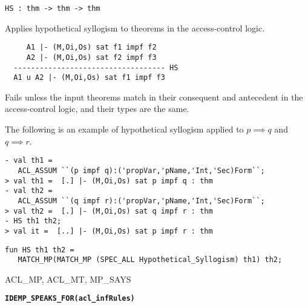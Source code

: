 \begin{verbatim}
HS : thm -> thm -> thm
\end{verbatim}

\SYNOPSIS
Applies hypothetical syllogism to theorems in the access-control logic.

\DESCRIBE
\begin{verbatim}
     A1 |- (M,Oi,Os) sat f1 impf f2
     A2 |- (M,Oi,Os) sat f2 impf f3
  ----------------------------------- HS
  A1 u A2 |- (M,Oi,Os) sat f1 impf f3
\end{verbatim}

\FAILURE 
Fails unless the input theorems match in their consequent and
antecedent in the access-control logic, and their types are the same.

\EXAMPLE
The following is an example of hypothetical syllogism applied to $p
\implies q$ and $q \implies r$.
\begin{holboxed}
\begin{verbatim}
- val th1 = 
   ACL_ASSUM ``(p impf q):('propVar,'pName,'Int,'Sec)Form``;
> val th1 =  [.] |- (M,Oi,Os) sat p impf q : thm
- val th2 = 
   ACL_ASSUM ``(q impf r):('propVar,'pName,'Int,'Sec)Form``;
> val th2 =  [.] |- (M,Oi,Os) sat q impf r : thm
- HS th1 th2;
> val it =  [..] |- (M,Oi,Os) sat p impf r : thm
\end{verbatim}

\end{holboxed}
\IMPLEMENTATION
\begin{holboxed}
\begin{verbatim}
fun HS th1 th2 = 
   MATCH_MP(MATCH_MP (SPEC_ALL Hypothetical_Syllogism) th1) th2;
\end{verbatim}
\end{holboxed}

\SEEALSO
ACL\_MP, ACL\_MT, MP\_SAYS
\ENDDOC

\begin{holboxed}
  \begin{Large}
    \textbf{\texttt{IDEMP_SPEAKS_FOR}}\hfill{}\textbf{\texttt{(acl\_infRules)}}
  \end{Large}
\end{holboxed}

